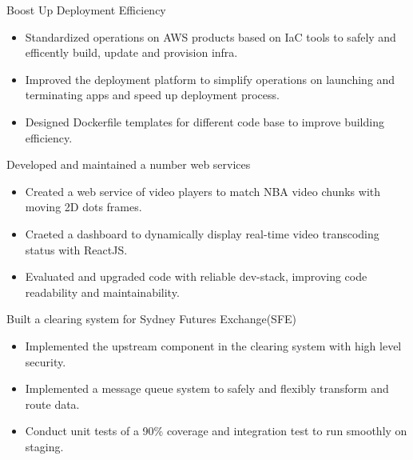 \documentclass{resume}
\begin{document}
Boost Up Deployment Efficiency
\begin{itemize}
  \item Standardized operations on AWS products based on IaC tools to safely and efficently build, update and provision infra.
  \item Improved the deployment platform to simplify operations on launching and terminating apps and speed up deployment process.
  \item Designed Dockerfile templates for different code base to improve building efficiency.
\end{itemize}

Developed and maintained a number web services
\begin{itemize}
  \item Created a web service of video players to match NBA video chunks with moving 2D dots frames.
  \item Craeted a dashboard to dynamically display real-time video transcoding status with ReactJS.
  \item Evaluated and upgraded code with reliable dev-stack, improving code readability and maintainability.
\end{itemize}

Built a clearing system for Sydney Futures Exchange(SFE)
\begin{itemize}
  \item Implemented the upstream component in the clearing system with high level security.
  \item Implemented a message queue system to safely and flexibly transform and route data.
  \item Conduct unit tests of a 90\% coverage and integration test to run smoothly on staging.
\end{itemize}


\end{document}
